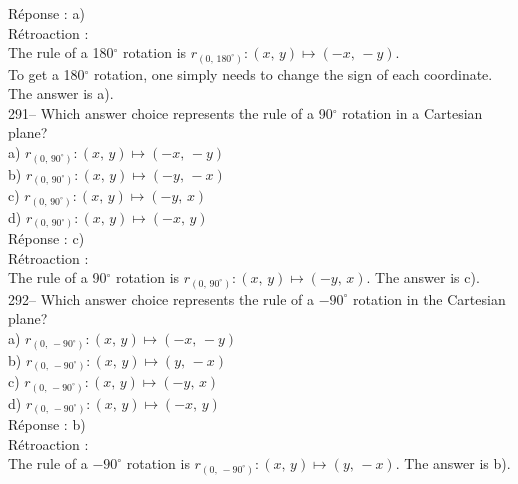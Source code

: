 \documentclass[letterpaper, 12pt]{article}
\begin{document}
R\'eponse : a)\\

R\'etroaction : \\
The rule of a 180$^{\circ}$ rotation is $r_{\left(
0,\,180^{\circ}\right) } :\left( x,\,y\right) \longmapsto
\left(-x,\,-y\right) $.\\
To get a 180$^{\circ}$ rotation, one simply needs to change the sign
of each coordinate. The answer is a).\\

291-- Which answer choice represents the rule of a 90$^{\circ}$ rotation in a Cartesian plane?\\

a) $r_{\left( 0,\,90^{\circ}\right) } :\left( x,\,y\right)
\longmapsto
\left(-x,\,-y\right) $ \\
b) $r_{\left( 0,\,90^{\circ}\right) } :\left( x,\,y\right)
\longmapsto
\left(-y,\,-x\right) $ \\
c) $r_{\left( 0,\,90^{\circ}\right) } :\left( x,\,y\right)
\longmapsto
\left(-y,\,x\right) $\\
d) $r_{\left( 0,\,90^{\circ}\right) } :\left( x,\,y\right)
\longmapsto
\left(-x,\,y\right) $\\

R\'eponse : c)\\

R\'etroaction : \\
The rule of a 90$^{\circ}$ rotation is $r_{\left(
0,\,90^{\circ}\right) } :\left( x,\,y\right) \longmapsto
\left(-y,\,x\right)
$. The answer is c).\\

292-- Which answer choice represents the rule of a  $-90^{\circ}$ rotation in the Cartesian plane?\\

a) $r_{\left( 0,\,-90^{\circ}\right) } :\left( x,\,y\right)
\longmapsto
\left(-x,\,-y\right) $ \\
b) $r_{\left( 0,\,-90^{\circ}\right) } :\left( x,\,y\right)
\longmapsto
\left( y,\,-x\right) $ \\
c) $r_{\left( 0,\,-90^{\circ}\right) } :\left( x,\,y\right)
\longmapsto
\left(-y,\,x\right) $\\
d) $r_{\left( 0,\,-90^{\circ}\right) } :\left( x,\,y\right)
\longmapsto
\left(-x,\,y\right) $\\

R\'eponse : b)\\

R\'etroaction : \\
The rule of a $-90^{\circ}$ rotation is $r_{\left(
0,\,-90^{\circ}\right) } :\left( x,\,y\right) \longmapsto \left(
y,\,-x\right) $.  The answer is b).\\
\end{document}
